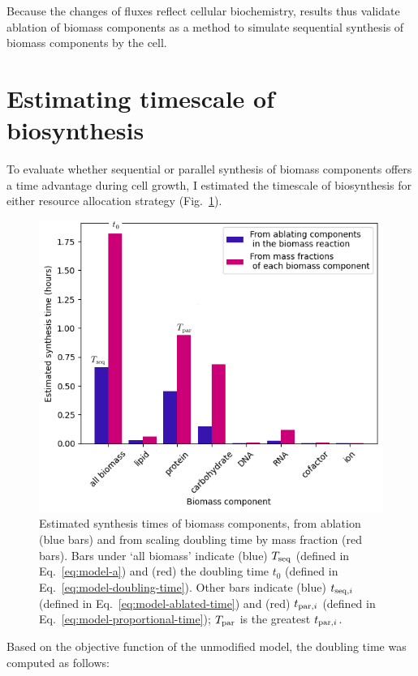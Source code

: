 Because the changes of fluxes reflect cellular biochemistry, results thus validate ablation of biomass components as a method to simulate sequential synthesis of biomass components by the cell.


\section{Estimating timescale of biosynthesis}
\label{sec:model-timescale}

To evaluate whether sequential or parallel synthesis of biomass components offers a time advantage during cell growth, I estimated the timescale of biosynthesis for either resource allocation strategy (Fig.\ \ref{fig:model-ablate-times}).

\begin{figure}[htbp!]
  \centering
  \includegraphics[width=.7\linewidth]{ablation_example_adapted.png}
  \caption[
    Estimated synthesis times of biomass components, from ablation and from scaling doubling time by mass fraction.
  ]{
    Estimated synthesis times of biomass components, from ablation (blue bars) and from scaling doubling time by mass fraction (red bars).
    Bars under `all biomass' indicate (blue) $T_{\mathrm{seq}}$ (defined in Eq.\ \ref{eq:model-a}) and (red) the doubling time $t_{0}$ (defined in Eq.\ \ref{eq:model-doubling-time}).
    Other bars indicate (blue) $t_{\mathrm{seq},i}$ (defined in Eq.\ \ref{eq:model-ablated-time}) and (red) $t_{\mathrm{par},i}$ (defined in Eq.\ \ref{eq:model-proportional-time}); $T_{\mathrm{par}}$ is the greatest $t_{\mathrm{par},i}$.
  }
  \label{fig:model-ablate-times}
\end{figure}

Based on the objective function of the unmodified model, the doubling time was computed as follows:

